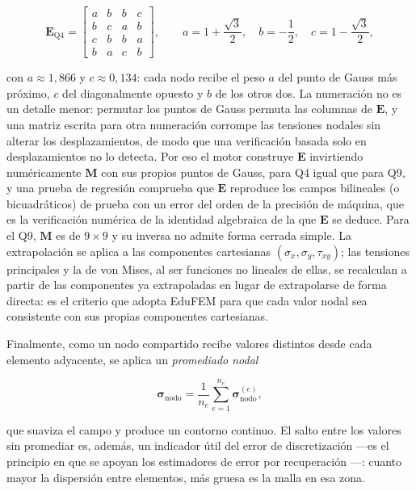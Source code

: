 \begin{equation}
\bm{E}_{\text{Q4}} =
\begin{bmatrix}
a & b & b & c \\
b & c & a & b \\
c & b & b & a \\
b & a & c & b
\end{bmatrix},
\qquad
a = 1+\frac{\sqrt{3}}{2},\quad
b = -\frac{1}{2},\quad
c = 1-\frac{\sqrt{3}}{2},
\label{eq:extrap-q4}
\end{equation}

con $a \approx 1{,}866$ y $c \approx 0{,}134$: cada nodo recibe el peso $a$ del punto de Gauss más próximo, $c$ del diagonalmente opuesto y $b$ de los otros dos. La numeración no es un detalle menor: permutar los puntos de Gauss permuta las columnas de $\bm{E}$, y una matriz escrita para otra numeración corrompe las tensiones nodales sin alterar los desplazamientos, de modo que una verificación basada solo en desplazamientos no lo detecta. Por eso el motor construye $\bm{E}$ invirtiendo numéricamente $\bm{M}$ con sus propios puntos de Gauss, para Q4 igual que para Q9, y una prueba de regresión comprueba que $\bm{E}$ reproduce los campos bilineales (o bicuadráticos) de prueba con un error del orden de la precisión de máquina, que es la verificación numérica de la identidad algebraica de la que $\bm{E}$ se deduce. Para el Q9, $\bm{M}$ es de $9\times9$ y su inversa no admite forma cerrada simple. La extrapolación se aplica a las componentes cartesianas $(\sigma_x,\sigma_y,\tau_{xy})$; las tensiones principales y la de von Mises, al ser funciones no lineales de ellas, se recalculan a partir de las componentes ya extrapoladas en lugar de extrapolarse de forma directa: es el criterio que adopta EduFEM para que cada valor nodal sea consistente con sus propias componentes cartesianas.

Finalmente, como un nodo compartido recibe valores distintos desde cada elemento adyacente, se aplica un \emph{promediado nodal}

\begin{equation}
\bm{\sigma}_{\text{nodo}} = \frac{1}{n_e}\sum_{e=1}^{n_e} \bm{\sigma}_{\text{nodo}}^{(e)},
\label{eq:promediado}
\end{equation}

que suaviza el campo y produce un contorno continuo. El salto entre los valores sin promediar es, además, un indicador útil del error de discretización —es el principio en que se apoyan los estimadores de error por recuperación \autocite[pp.~476-477]{zienkiewicz2013fem}—: cuanto mayor la dispersión entre elementos, más gruesa es la malla en esa zona.


